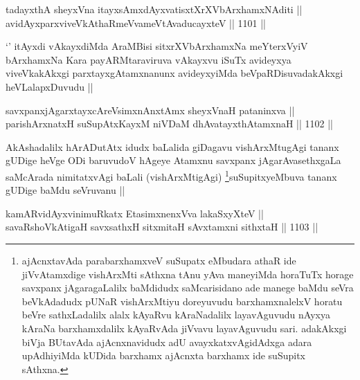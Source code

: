 
\begin{shl}
tadayxthA sheyxVna itayxsAmxdAyxvatisxtXrXVbArxhamxNAditi || \\
avidAyxparxviveVkAthaRmeVvameVtAvaducayxteV ||  1101 ||  
\end{shl}

\begin{artha}
`\stext' itAyxdi vAkayxdiMda AraMBisi sitxrXVbArxhamxNa meYterxVyiV bArxhamxNa Kara payARMtaraviruva vAkayxvu iSuTx avideyxya viveVkakAkxgi parxtayxgAtamxnanunx avideyxyiMda beVpaRDisuvadakAkxgi heVLalapxDuvudu ||
\end{artha}


\begin{shl}
savxpanxjAgarxtayxcAreV\s simxnAnxtAmx sheyxVnaH pataninxva || \\
parishArxnatxH suSupAtxKayxM niVDaM dhAvatayxthA\s \s tamxnaH ||  1102 ||  
\end{shl}

\begin{artha}
AkAshadalilx hArADutAtx idudx baLalida giDagavu vishArxMtugAgi tananx gUDige heVge ODi baruvudoV hAgeye Atamxnu savxpanx jAgarAvasethxgaLa saMcArada nimitatxvAgi baLali (vishArxMtigAgi) \footnote{ajAcnxtavAda parabarxhamxveV suSupatx eMbudara athaR ide jiVvAtamxdige vishArxMti sAthxna tAnu yAva maneyiMda horaTuTx horage savxpanx jAgaragaLalilx baMdidudx saMcarisidano ade manege baMdu seVra beVkAdadudx pUNaR vishArxMtiyu doreyuvudu barxhamxnalelxV horatu beVre sathxLadalilx alalx kAyaRvu kAraNadalilx layavAguvudu nAyxya kAraNa barxhamxdalilx kAyaRvAda jiVvavu layavAguvudu sari. adakAkxgi biVja BUtavAda ajAcnxnavidudx adU avayxkatxvAgidAdxga adara upAdhiyiMda kUDida barxhamx ajAcnxta barxhamx ide suSupitx sAthxna.}suSupitxyeMbuva tananx gUDige baMdu seVruvanu ||
\end{artha}


\begin{shl}
kamARvidAyxvinimuRkatx EtasimxnenxVva lakaSxyXteV || \\
savaRshoVkAtigaH savxsathxH sitxmitaH sAvxtamxni sithxtaH ||  1103 ||  
\end{shl}

